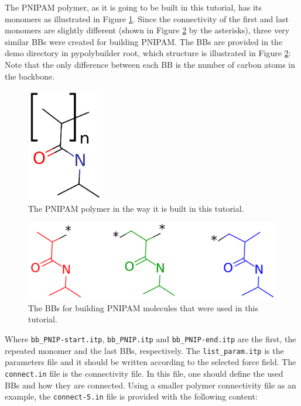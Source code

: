 
The PNIPAM polymer, as it is going to be built in this tutorial, has its monomers as illustrated in Figure \ref{fig:PNIPAMPOL}.
Since the connectivity of the first and last monomers are slightly different (shown in Figure \ref{fig:PNIPAMBBs} by the asterisks), three very similar BBs were created for building PNIPAM.
The BBs are provided in the demo directory in pypolybuilder root, which structure is illustrated in Figure \ref{fig:PNIPAMBBs}:
Note that the only difference between each BB is the number of carbon atoms in the backbone.

\begin{figure}
    \center
    \includegraphics[width=0.3\textwidth]{PNIPAM/PNIPAMPOL.png}
    \caption{The PNIPAM polymer in the way it is built in this tutorial.}
    \label{fig:PNIPAMPOL}
\end{figure}

\begin{figure}
    \centering
    \includegraphics[width=\textwidth]{PNIPAM/PNIPAMBBs.png}
    \caption{The BBs for building PNIPAM molecules that were used in this tutorial.}
    \label{fig:PNIPAMBBs}
\end{figure}


Where \texttt{bb\_PNIP-start.itp}, \texttt{bb\_PNIP.itp} and \texttt{bb\_PNIP-end.itp} are the first, the repeated monomer and the last BBs, respectively.
The \texttt{list\_param.itp} is the parameters file and it should be written according to the selected force field.
The \texttt{connect.in} file is the connectivity file.
In this file, one should define the used BBs and how they are connected.
Using a smaller polymer connectivity file as an example, the \texttt{connect-5.in} file is provided with the following content:

